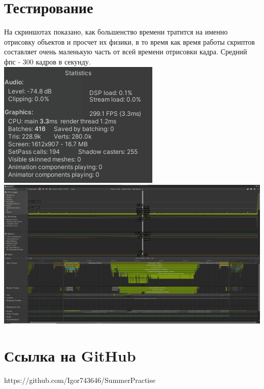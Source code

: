 \section*{Тестирование}


На скриншотах показано, как большенство времени тратится на именно отрисовку объектов и просчет их физики, в то время как время работы скриптов составляет очень маленькую часть от всей времени отрисовки кадра. Средний фпс - 300 кадров в секунду.
\\
\noindent
\includegraphics[scale=1]{images/11.jpg} \\
\includegraphics[scale=0.25]{images/12.jpg}

\section*{Ссылка на GitHub}

https://github.com/Igor743646/SummerPractise

\pagebreak
